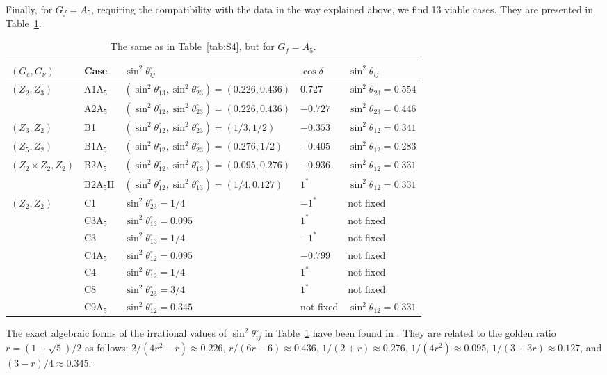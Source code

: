\documentclass[11pt,a4paper]{article}
\def\th{\theta}
\numberwithin{equation}{section}
\begin{document}
 Finally, for $G_f = A_5$, requiring the compatibility with the data 
in the way explained above, we find 13 viable cases. 
They are presented in Table~\ref{tab:A5}. 
\begin{table}
\centering
\renewcommand*{\arraystretch}{1.2}
\begin{adjustbox}{max width=\textwidth}
\begin{tabular}{lllll}
\toprule
$(G_e,G_\nu)$ & Case & $\sin^2\th^\circ_{ij}$ & $\cos\delta$ & $\sin^2 \theta_{ij}$\\
\midrule
\multirow{2}{*}{$(Z_2,Z_3)$} & A1A$_5$ & 
$(\sin^2 \theta^{\circ}_{13},\sin^2 \theta^{\circ}_{23}) = (0.226,0.436)$ & 
$0.727$ & $\sin^2\th_{23} = 0.554$ \\ 
& A2A$_5$ & $(\sin^2 \theta^{\circ}_{12},\sin^2 \theta^{\circ}_{23}) = (0.226,0.436)$ & 
$-0.727$ & $\sin^2\th_{23} = 0.446$ \\ 
\midrule
$(Z_3,Z_2)$ & B1 & $(\sin^2 \theta^{\circ}_{12},\sin^2 \theta^{\circ}_{23}) = (1/3,1/2)$ 
& $-0.353$ & $\sin^2\th_{12} = 0.341$ \\
\midrule 
$(Z_5,Z_2)$ & B1A$_5$ & $(\sin^2 \theta^{\circ}_{12},\sin^2 \theta^{\circ}_{23}) = (0.276,1/2)$ & 
$-0.405$ & $\sin^2 \theta_{12} = 0.283$ \\ 
\midrule
\multirow{2}{*}{$(Z_2 \times Z_2,Z_2)$} & 
B2A$_5$ & $(\sin^2 \theta^{\circ}_{12},\sin^2 \theta^{\circ}_{13}) = (0.095,0.276)$ & 
$-0.936$ & $\sin^2\th_{12} = 0.331$ \\ 
& B2A$_5$II & $(\sin^2 \theta^{\circ}_{12},\sin^2 \theta^{\circ}_{13}) = (1/4,0.127)$ & 
$1^*$ & $\sin^2\th_{12} = 0.331$  \\ 
\midrule
\multirow{7}{*}{$(Z_2,Z_2)$} & C1 & $\sin^2 \theta^{\circ}_{23} = 1/4$ & $-1^*$ & not fixed\\      
& C3A$_5$ & $\sin^2 \theta^{\circ}_{13} = 0.095$ & $1^*$ & not fixed\\
& C3 & $\sin^2 \theta^{\circ}_{13} = 1/4$ & $-1^*$ & not fixed\\   
& C4A$_5$ & $\sin^2 \theta^{\circ}_{12} = 0.095$ & $-0.799$ & not fixed \\
& C4 & $\sin^2 \theta^{\circ}_{12} = 1/4$ & $1^*$ & not fixed \\
& C8 & $\sin^2 \theta^{\circ}_{23} = 3/4$ & $1^*$ & not fixed \\
& C9A$_5$ & $\sin^2 \theta^{\circ}_{12} = 0.345$ & not fixed & $\sin^2 \theta_{12} = 0.331$ \\
\bottomrule
\end{tabular}
\end{adjustbox}
\caption{The same as in Table~\ref{tab:S4}, but for $G_f = A_5$.}
\label{tab:A5}
\end{table}
%
The exact algebraic forms of the 
irrational values of $\sin^2 \theta^{\circ}_{ij}$ in Table~\ref{tab:A5}
have been found in \cite{Girardi:2015rwa}. 
They are related to the golden ratio $r=(1+\sqrt{5})/2$ 
as follows:  
$2/(4 r^2 - r) \approx 0.226$, 
$r/(6r - 6) \approx 0.436$,
$1/(2 + r) \approx 0.276$,
$1/(4 r^2) \approx 0.095$, 
$1/(3 + 3 r) \approx 0.127$, 
and $(3 - r)/4 \approx 0.345$. 
\end{document}
